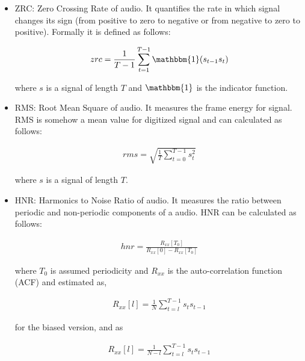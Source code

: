 \documentclass[oneside]{report}
\begin{document}
        \begin{itemize}
    
        \item  ZRC: Zero Crossing Rate of audio. It quantifies the rate in which signal changes its sign (from positive to zero to negative or from negative to zero to positive). Formally it is defined as follows: 
        
        \begin{align*}
            zrc = \frac{1}{T - 1} \sum_{t = 1}^{T - 1} \mathbbm{1} (s_{t-1}s_{t})
        \end{align*} 
        
        where \( s \) is a signal of length \( T \) and \( \mathbbm{1} \) is the indicator function. \\
        
        
        \item  RMS: Root Mean Square of audio. It measures the frame energy for signal. RMS is somehow a mean value for digitized signal and can calculated as follows: 
        
        \begin{align*}
            rms = \sqrt{\frac{1}{T} \sum_{t = 0}^{T - 1} s_{t}^2}
        \end{align*}
        
        where \( s \) is a signal of length \( T \). \\
        
        \item HNR: Harmonics to Noise Ratio of audio. It measures the ratio between periodic and non-periodic components of a audio. HNR can be calculated as follows:
        
        \begin{align*}
            hnr = \frac{R_{xx}[T_0]}{R_{xx}[0] - R_{xx}[T_0]}
        \end{align*}
        
        where $T_0$ is assumed periodicity and $R_{xx}$ is the auto-correlation function (ACF) and estimated as,
        
        \begin{align*}
            R_{xx}[l] = \frac{1}{N} \sum_{t = l}^{T - 1} s_{t}s_{t - 1}
        \end{align*}
        
        for the biased version, and as 
        
        \begin{align*}
            R_{xx}[l] = \frac{1}{N-l} \sum_{t = l}^{T - 1} s_{t}s_{t - 1}
        \end{align*}
        

\end{itemize}
\end{document}
